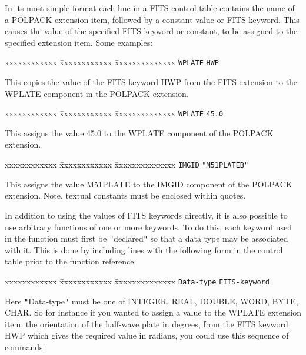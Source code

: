 \documentclass[twoside,11pt]{article}
\renewcommand{\_}{\texttt{\symbol{95}}}
\begin{document}
{{      In its most simple format each line in a FITS control table contains
      the name of a POLPACK extension item, followed by a constant value
      or FITS keyword. This causes the value of the specified FITS keyword
      or constant, to be assigned to the specified extension item. Some
      examples:

\begin{tabbing}
 xxxxxxxxxxxx \= xxxxxxxxxxxx            \= xxxxxxxxxxxxxx \kill
              \>  \texttt{WPLATE}        \> \texttt{HWP}  
\end{tabbing}

      This copies the value of the FITS keyword HWP from the FITS
      extension to the WPLATE component in the POLPACK extension.

\begin{tabbing}
 xxxxxxxxxxxx \= xxxxxxxxxxxx            \= xxxxxxxxxxxxxx \kill
              \>  \texttt{WPLATE}        \> \texttt{45.0}  
\end{tabbing}

      This assigns the value 45.0 to the WPLATE component of the POLPACK
      extension.

\begin{tabbing}
 xxxxxxxxxxxx \= xxxxxxxxxxxx            \= xxxxxxxxxxxxxx \kill
              \>  \texttt{IMGID}        \> \texttt{"M51\_PLATEB"}  
\end{tabbing}

      This assigns the value M51\_PLATE to the IMGID component of the
      POLPACK extension. Note, textual constants must be enclosed within
      quotes.

      In addition to using the values of FITS keywords directly, it is also
      possible to use arbitrary functions of one or more keywords. To do
      this, each keyword used in the function must first be {\tt "}declared{\tt "} so
      that a data type may be associated with it. This is done by including
      lines with the following form in the control table prior to the
      function reference:

\begin{tabbing}
 xxxxxxxxxxxx \= xxxxxxxxxxxx            \= xxxxxxxxxxxxxx \kill
              \>  \texttt{Data-type}        \> \texttt{FITS-keyword}  
\end{tabbing}

      Here {\tt "}Data-type{\tt "} must be one of \_INTEGER, \_REAL, \_DOUBLE, \_WORD, \_BYTE,
      \_CHAR. So for instance if you wanted to assign a value to the WPLATE
      extension item, the orientation of the half-wave plate in degrees, from
      the FITS keyword HWP which gives the required value in radians, you
      could use this sequence of commands:

}}
\end{document}
